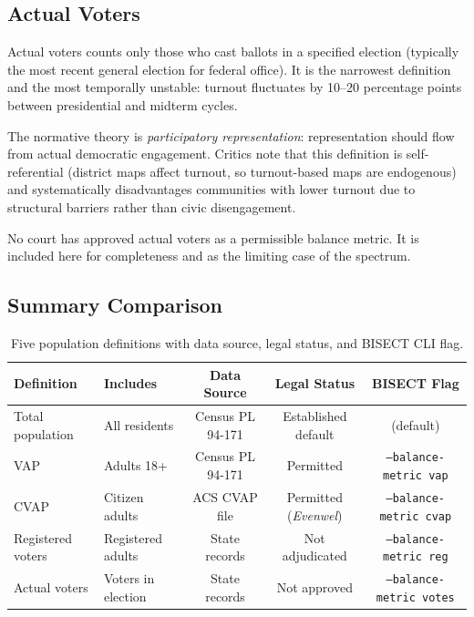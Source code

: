 \subsection{Actual Voters}

Actual voters counts only those who cast ballots in a specified election (typically the most recent general election for federal office). It is the narrowest definition and the most temporally unstable: turnout fluctuates by 10--20 percentage points between presidential and midterm cycles.

The normative theory is \emph{participatory representation}: representation should flow from actual democratic engagement. Critics note that this definition is self-referential (district maps affect turnout, so turnout-based maps are endogenous) and systematically disadvantages communities with lower turnout due to structural barriers rather than civic disengagement.

No court has approved actual voters as a permissible balance metric. It is included here for completeness and as the limiting case of the spectrum.

\subsection{Summary Comparison}

\begin{table}[h]
\centering
\begin{tabular}{llccc}
\toprule
\textbf{Definition} & \textbf{Includes} & \textbf{Data Source} & \textbf{Legal Status} & \textbf{BISECT Flag} \\
\midrule
Total population & All residents & Census PL 94-171 & Established default & (default) \\
VAP & Adults 18+ & Census PL 94-171 & Permitted & \texttt{--balance-metric vap} \\
CVAP & Citizen adults & ACS CVAP file & Permitted (\emph{Evenwel}) & \texttt{--balance-metric cvap} \\
Registered voters & Registered adults & State records & Not adjudicated & \texttt{--balance-metric reg} \\
Actual voters & Voters in election & State records & Not approved & \texttt{--balance-metric votes} \\
\bottomrule
\end{tabular}
\caption{Five population definitions with data source, legal status, and BISECT CLI flag.}
\label{tab:five-defs}
\end{table}
